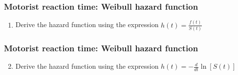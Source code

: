 \begin{frame}
\frametitle{Motorist reaction time: Weibull hazard function}
\begin{enumerate}
\item Derive the hazard function using the expression $h(t)=\frac{f(t)}{S(t)}$
\end{enumerate}
\vskip150pt
\end{frame}

\begin{frame}
\frametitle{Motorist reaction time: Weibull hazard function}
\begin{enumerate}
\setcounter{enumi}{1}
\item Derive the hazard function using the expression $h(t)=-\frac{d}{dt}\ln[S(t)]$
\end{enumerate}
\vskip150pt
\end{frame}

